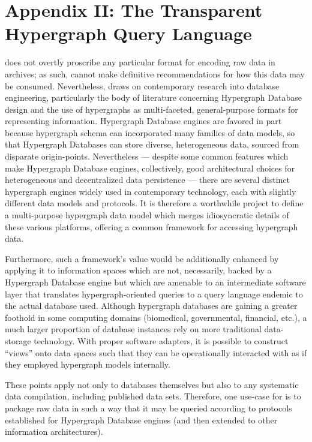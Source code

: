 \documentclass[12pt,letterpaper]{article}
\newcommand{\ATexttclr}[1]{\textcolor{tcolor}{\textbf{#1}}}
\newcommand{\lSDRF}{\resizebox{!}{8pt}{\ATexttclr{S}}\resizebox{!}{8pt}{\ATexttclr{DR%
\hspace{1pt}{\raisebox{-.5pt}{\fontfamily{qhv}\fontseries{b}\selectfont{}\Large{F}}%
}}}}
\newcommand{\SDRF}{\resizebox{!}{8pt}{\ATexttclr{S}}\resizebox{!}{8pt}{\ATexttclr{DR%
\hspace{1pt}{\raisebox{-1pt}{\fontfamily{qhv}\fontseries{b}\selectfont{}\Large{F}}%
}}}}
\newcommand{\p}[1]{

\vspace{.7em}#1}
\newcommand{\q}[1]{{\fontfamily{qcr}\selectfont ``}#1{\fontfamily{qcr}\selectfont ''}}
\begin{document}
{\section{Appendix II: The Transparent Hypergraph Query Language}
\p{\lSDRF{} does not overtly proscribe any particular 
format for encoding raw data in \SDRF{} archives; 
as such, \SDRF{} cannot make definitive recommendations 
for how this data may be consumed.  Nevertheless, 
\SDRF{} draws on contemporary research into database 
engineering, particularly the body of literature 
concerning Hypergraph Database design and the 
use of hypergraphs as multi-faceted, general-purpose 
formats for representing information.  Hypergraph 
Database engines are favored in part because hypergraph 
schema can incorporated many families of data models, 
so that Hypergraph Databases can store diverse, heterogeneous 
data, sourced from disparate origin-points.  
Nevertheless --- despite some common features which make Hypergraph Database 
engines, collectively, good architectural choices 
for heterogeneous and decentralized data persistence ---  
there are several distinct hypergraph engines 
widely used in contemporary technology, each with slightly 
different data models and protocols.  It is therefore a 
worthwhile project to define a multi-purpose hypergraph data 
model which merges idiosyncratic details of 
these various platforms, offering a common framework for 
accessing hypergraph data.}

\p{Furthermore, such a framework's value would 
be additionally enhanced by applying it to information spaces which 
are not, necessarily, backed by a Hypergraph Database engine 
but which are amenable to an intermediate software layer that 
translates hypergraph-oriented queries to a query language 
endemic to the actual database used.  Although hypergraph databases 
are gaining a greater foothold in some computing domains 
(biomedical, governmental, financial, etc.), a much larger 
proportion of database instances rely on more traditional 
data-storage technology.   With proper software 
adapters, it is possible to construct \q{views} onto 
data spaces such that they can be operationally interacted 
with as if they employed hypergraph models internally.}

\p{These points apply not only to databases themselves 
but also to any systematic data compilation, including 
published data sets.  Therefore, one use-case for 
\SDRF{} is to package raw data in such a way that 
it may be queried according to protocols established 
for Hypergraph Database engines (and then extended 
to other information architectures).}

}
\end{document}
